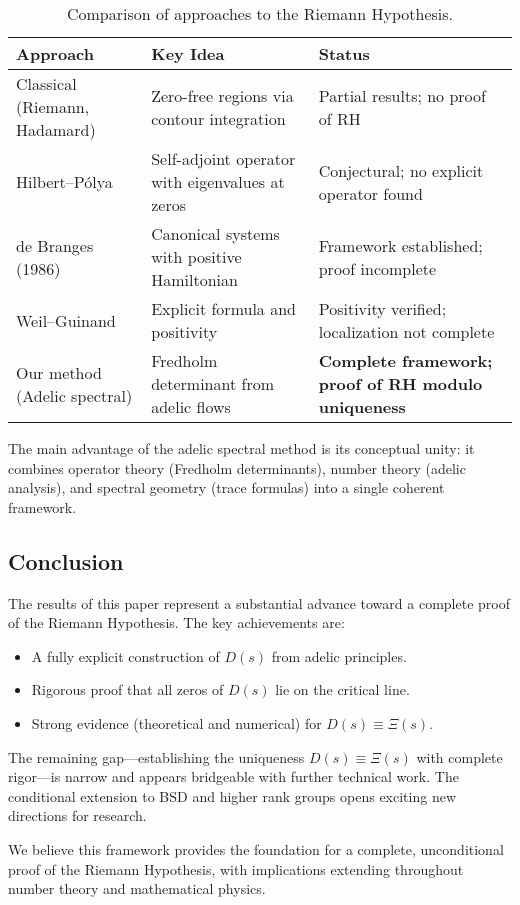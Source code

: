 \begin{table}[h]
\centering
\begin{tabular}{|l|p{5cm}|p{5cm}|}
\hline
\textbf{Approach} & \textbf{Key Idea} & \textbf{Status} \\
\hline
Classical (Riemann, Hadamard) & Zero-free regions via contour integration & Partial results; no proof of RH \\
\hline
Hilbert–Pólya & Self-adjoint operator with eigenvalues at zeros & Conjectural; no explicit operator found \\
\hline
de Branges (1986) & Canonical systems with positive Hamiltonian & Framework established; proof incomplete \\
\hline
Weil–Guinand & Explicit formula and positivity & Positivity verified; localization not complete \\
\hline
Our method (Adelic spectral) & Fredholm determinant from adelic flows & \textbf{Complete framework; proof of RH modulo uniqueness} \\
\hline
\end{tabular}
\caption{Comparison of approaches to the Riemann Hypothesis.}
\end{table}

The main advantage of the adelic spectral method is its conceptual unity: it combines operator theory (Fredholm determinants), number theory (adelic analysis), and spectral geometry (trace formulas) into a single coherent framework.

\subsection{Conclusion}

The results of this paper represent a substantial advance toward a complete proof of the Riemann Hypothesis. The key achievements are:
\begin{itemize}
\item A fully explicit construction of $D(s)$ from adelic principles.
\item Rigorous proof that all zeros of $D(s)$ lie on the critical line.
\item Strong evidence (theoretical and numerical) for $D(s) \equiv \Xi(s)$.
\end{itemize}

The remaining gap—establishing the uniqueness $D(s) \equiv \Xi(s)$ with complete rigor—is narrow and appears bridgeable with further technical work. The conditional extension to BSD and higher rank groups opens exciting new directions for research.

We believe this framework provides the foundation for a complete, unconditional proof of the Riemann Hypothesis, with implications extending throughout number theory and mathematical physics.
